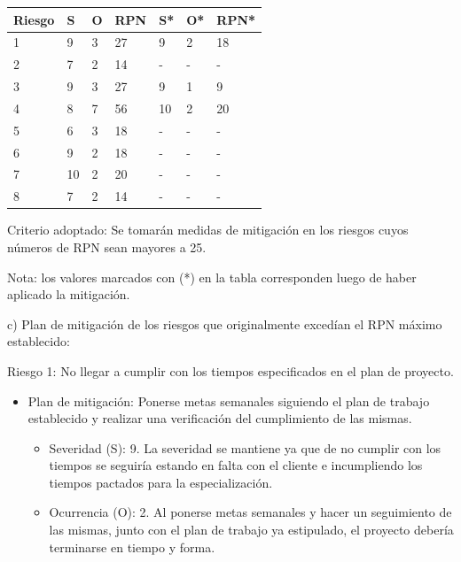 \documentclass[11pt]{charter}
\begin{document}
\begin{table}[htpb]
\centering
\begin{tabularx}{\linewidth}{@{}|X|X|X|X|X|X|X|@{}}
\hline
\rowcolor[HTML]{C0C0C0} 
Riesgo & S & O & RPN & S* & O* & RPN* \\ \hline
    1  & 9 & 3 & \cellcolor[HTML]{F33B01} 27 &  9  &  2  & \cellcolor[HTML]{4EF301} 18     \\ \hline
    2  & 7 & 2 & \cellcolor[HTML]{4EF301} 14 &  -  &  -  & -     \\ \hline
    3  & 9 & 3 & \cellcolor[HTML]{F33B01} 27 &  9  &  1  &\cellcolor[HTML]{4EF301} 9     \\ \hline
    4  & 8 & 7 & \cellcolor[HTML]{F33B01} 56 &  10  & 2   & \cellcolor[HTML]{4EF301} 20     \\ \hline
    5  & 6 & 3 & \cellcolor[HTML]{4EF301} 18 &  -  & -   & -     \\ \hline
    6  & 9 & 2 & \cellcolor[HTML]{4EF301} 18 &  -  & -   & -     \\ \hline
    7  & 10 & 2 & \cellcolor[HTML]{4EF301}20 &  -  &  -  &   -   \\ \hline
    8  & 7 & 2 & \cellcolor[HTML]{4EF301} 14 &  -  &  -  &   -   \\ \hline
\end{tabularx}%
\end{table}

Criterio adoptado: 
Se tomarán medidas de mitigación en los riesgos cuyos números de RPN sean mayores a 25.

Nota: los valores marcados con (*) en la tabla corresponden luego de haber aplicado la mitigación.

c) Plan de mitigación de los riesgos que originalmente excedían el RPN máximo establecido:
 
Riesgo 1: No llegar a cumplir con los tiempos especificados en el plan de proyecto.
\begin{itemize}
\item Plan de mitigación: Ponerse metas semanales siguiendo el plan de trabajo establecido y realizar una verificación del cumplimiento de las mismas.
	\begin{itemize}
	\item Severidad (S): 9. La severidad se mantiene ya que de no cumplir con los tiempos se seguiría estando en falta con el cliente e incumpliendo los tiempos pactados para la especialización.
	\item Ocurrencia (O): 2. Al ponerse metas semanales y hacer un seguimiento de las mismas, junto con el plan de trabajo ya estipulado, el proyecto debería terminarse en tiempo y forma.
	\end{itemize}
\end{itemize}
\end{document}
